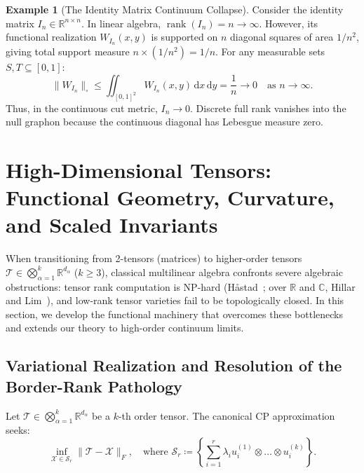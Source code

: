 \documentclass[11pt,a4paper,reqno]{amsart}
\theoremstyle{definition}
\newtheorem{example}[theorem]{Example}
\numberwithin{equation}{section}
\providecommand{\R}{\mathbb{R}}
\newcommand{\C}{\mathbb{C}}
\newcommand{\rank}{\operatorname{rank}}
\providecommand{\cutnorm}[1]{\|#1\|_{\square}}
\newcommand{\dif}{\,\mathrm{d}}
\begin{document}
\begin{example}[The Identity Matrix Continuum Collapse]
Consider the identity matrix $I_n \in \R^{n \times n}$. In linear algebra, $\rank(I_n) = n \to \infty$. However, its functional realization $W_{I_n}(x, y)$ is supported on $n$ diagonal squares of area $1/n^2$, giving total support measure $n \times (1/n^2) = 1/n$. For any measurable sets $S, T \subseteq [0, 1]$:
\begin{equation}
    \cutnorm{W_{I_n}} \le \iint_{[0,1]^2} W_{I_n}(x, y) \dif x \dif y = \frac{1}{n} \longrightarrow 0 \quad \text{as } n \to \infty.
\end{equation}
Thus, in the continuous cut metric, $I_n \to 0$. Discrete full rank vanishes into the null graphon because the continuous diagonal has Lebesgue measure zero.
\end{example}

\section{High-Dimensional Tensors: Functional Geometry, Curvature, and Scaled Invariants}
\label{sec:tensors}

When transitioning from 2-tensors (matrices) to higher-order tensors $\mathcal{T} \in \bigotimes_{\alpha=1}^k \R^{d_\alpha}$ ($k \ge 3$), classical multilinear algebra confronts severe algebraic obstructions: tensor rank computation is NP-hard (H{\aa}stad~\cite{hastad1990}; over $\R$ and $\C$, Hillar and Lim~\cite{hillar2013most}), and low-rank tensor varieties fail to be topologically closed. In this section, we develop the functional machinery that overcomes these bottlenecks and extends our theory to high-order continuum limits.

\subsection{Variational Realization and Resolution of the Border-Rank Pathology}
\label{subsec:tensors_border_rank}

Let $\mathcal{T} \in \bigotimes_{\alpha=1}^k \R^{d_\alpha}$ be a $k$-th order tensor. The canonical CP approximation seeks:
\begin{equation}
    \label{eq:cp_approx_problem}
    \inf_{\mathcal{X} \in \mathcal{S}_r} \|\mathcal{T} - \mathcal{X}\|_F, \quad \text{where } \mathcal{S}_r \coloneqq \left\{ \sum_{i=1}^r \lambda_i u_i^{(1)} \otimes \dots \otimes u_i^{(k)} \right\}.
\end{equation}
\end{document}
